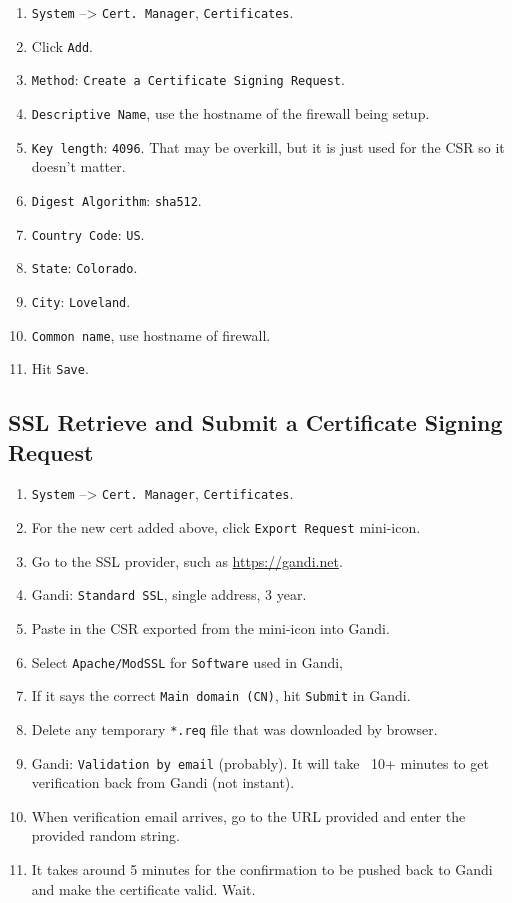 \begin{enumerate}
 \item \texttt{System} --> \texttt{Cert. Manager}, \texttt{Certificates}.
 \item Click \texttt{Add}.
 \item \texttt{Method}: \texttt{Create a Certificate Signing Request}.
 \item \texttt{Descriptive Name}, use the hostname of the firewall being setup.
 \item \texttt{Key length}: \texttt{4096}. That may be overkill, but it is just used for the CSR so it doesn't matter.
 \item \texttt{Digest Algorithm}: \texttt{sha512}.
 \item \texttt{Country Code}: \texttt{US}.
 \item \texttt{State}: \texttt{Colorado}. %
 \item \texttt{City}: \texttt{Loveland}.
 \item \texttt{Common name}, use hostname of firewall.
 \item Hit \texttt{Save}.
\end{enumerate}

\subsection{SSL Retrieve and Submit a Certificate Signing Request}
\begin{enumerate}
 \item \texttt{System} --> \texttt{Cert. Manager}, \texttt{Certificates}.
 \item For the new cert added above, click \texttt{Export Request} mini-icon.
 \item Go to the SSL provider, such as \url{https://gandi.net}.
 \item Gandi: \texttt{Standard SSL}, single address, 3 year.
 \item Paste in the CSR exported from the mini-icon into Gandi.
 \item Select \texttt{Apache/ModSSL} for \texttt{Software} used in Gandi, 
 \item If it says the correct \texttt{Main domain (CN)}, hit \texttt{Submit} in Gandi.
 \item Delete any temporary \texttt{*.req} file that was downloaded by browser.
 \item Gandi: \texttt{Validation by email} (probably). It will take ~10+ minutes to get verification back from Gandi (not instant).
 \item When verification email arrives, go to the URL provided and enter the provided random string.
 \item It takes around 5 minutes for the confirmation to be pushed back to Gandi and make the certificate valid. Wait.
\end{enumerate}


